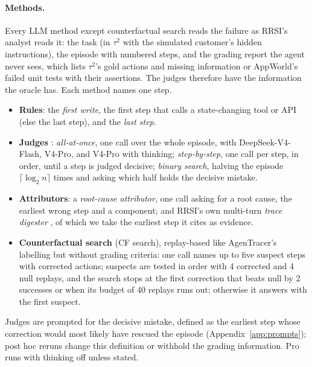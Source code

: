 \documentclass[11pt]{article}
\begin{document}
\paragraph{Methods.} Every LLM method except counterfactual search reads the failure as RRSI's analyst reads it: the task (in $\tau^2$ with the simulated customer's hidden instructions), the episode with numbered steps, and the grading report the agent never sees, which lists $\tau^2$'s gold actions and missing information or AppWorld's failed unit tests with their assertions. The judges therefore have the information the oracle has. Each method names one step.
\begin{itemize}
\setlength\itemsep{0pt}
\item \textbf{Rules}: the \emph{first write}, the first step that calls a state-changing tool or API (else the last step), and the \emph{last step}.
\item \textbf{Judges} \citep{zhang2025whichagent}: \emph{all-at-once}, one call over the whole episode, with DeepSeek-V4-Flash, V4-Pro, and V4-Pro with thinking; \emph{step-by-step}, one call per step, in order, until a step is judged decisive; \emph{binary search}, halving the episode $\lceil\log_2 n\rceil$ times and asking which half holds the decisive mistake.
\item \textbf{Attributors}: a \emph{root-cause attributor}, one call asking for a root cause, the earliest wrong step and a component; and RRSI's own multi-turn \emph{trace digester} \citep{rrsi2026}, of which we take the earliest step it cites as evidence.
\item \textbf{Counterfactual search} (CF search), replay-based like AgenTracer's labelling \citep{zhang2026agentracer} but without grading criteria: one call names up to five suspect steps with corrected actions; suspects are tested in order with 4 corrected and 4 null replays, and the search stops at the first correction that beats null by 2 successes or when its budget of 40 replays runs out; otherwise it answers with the first suspect.
\end{itemize}
Judges are prompted for the decisive mistake, defined as the earliest step whose correction would most likely have rescued the episode (Appendix~\ref{app:prompts}); post hoc reruns change this definition or withhold the grading information. Pro runs with thinking off unless stated.
\end{document}
